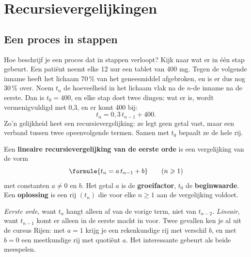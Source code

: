 \begin{oefeningen}[Start]

\end{oefeningen}

\section{Recursievergelijkingen}

\subsection{Een proces in stappen}

Hoe beschrijf je een proces dat in stappen verloopt? Kijk naar wat er in één stap gebeurt. Een patiënt neemt elke 12 uur een tablet van 400 mg. Tegen de volgende inname heeft het lichaam 70\,\% van het geneesmiddel afgebroken, en is er dus nog 30\,\% over. Noem $t_n$ de hoeveelheid in het lichaam vlak na de $n$-de inname na de eerste. Dan is $t_0 = 400$, en elke stap doet twee dingen: wat er is, wordt vermenigvuldigd met 0,3, en er komt 400 bij:
\[
t_n = 0{,}3\, t_{n-1} + 400 .
\]
Zo'n gelijkheid heet een recursievergelijking: ze legt geen getal vast, maar een verband tussen twee opeenvolgende termen. Samen met $t_0$ bepaalt ze de hele rij.

\begin{theorie}
Een \textbf{\textcolor{accent}{lineaire recursievergelijking van de eerste orde}} is een vergelijking van de vorm
\[
\formule{t_n = a\, t_{n-1} + b} \qquad (n \geqslant 1)
\]
met constanten $a \neq 0$ en $b$. Het getal $a$ is de \textbf{\textcolor{accent}{groeifactor}}, $t_0$ de \textbf{\textcolor{accent}{beginwaarde}}. Een \textbf{\textcolor{accent}{oplossing}} is een rij $(t_n)$ die voor elke $n \geqslant 1$ aan de vergelijking voldoet.
\end{theorie}

\textit{Eerste orde}, want $t_n$ hangt alleen af van de vorige term, niet van $t_{n-2}$. \textit{Lineair}, want $t_{n-1}$ komt er alleen in de eerste macht in voor. Twee gevallen ken je al uit de cursus Rijen: met $a = 1$ krijg je een rekenkundige rij met verschil $b$, en met $b = 0$ een meetkundige rij met quotiënt $a$. Het interessante gebeurt als beide meespelen.

